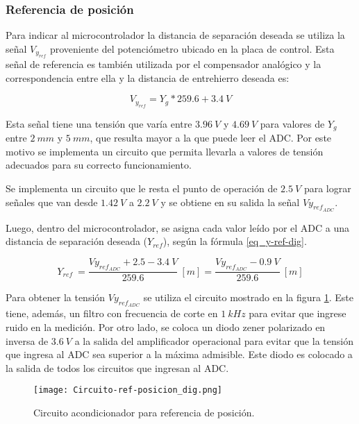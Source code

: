 \subsubsection{Referencia de posición} \label{sec_referencia_pos}

 Para indicar al microcontrolador la distancia de separación deseada se utiliza la señal  $V_{y_{ref}}$ proveniente del potenciómetro ubicado en la placa de control. Esta señal de referencia es también utilizada por el compensador analógico y la correspondencia entre ella y la distancia de entrehierro deseada es:
 
 \begin{equation} \label{eq_vyref_vs_yg}
 	V_{y_{ref}}=Y_g*259.6+3.4\:V
 \end{equation}
 
Esta señal tiene una tensión que varía entre $3.96\:V$ y $4.69\:V$ para valores de $Y_g$ entre $2\:mm$ y $5\:mm$, que resulta mayor a la que puede leer el ADC. Por este motivo se implementa un circuito que permita llevarla a valores de tensión adecuados para su correcto funcionamiento. 

Se implementa un circuito que le resta el punto de operación de $2.5\:V$  para lograr señales que van desde $1.42\:V$ a $2.2\:V$ y se obtiene en su salida la señal $Vy_{ref_{ADC}}$.

Luego, dentro del microcontrolador, se asigna cada valor leído por el ADC a una distancia de separación deseada ($Y_{ref}$), según la fórmula \ref{eq_y-ref-dig}.

\begin{equation} \label{eq_y-ref-dig}
	Y_{ref}\ =\frac{Vy_{ref_{ADC}} +2.5 - 3.4\:V}{259.6}\:[m]=\frac{Vy_{ref_{ADC}} - 0.9\:V}{259.6}\:[m]
\end{equation}

Para obtener la tensión $Vy_{ref_{ADC}}$ se utiliza el circuito mostrado en la figura \ref{fig:circuito-ref-posicion}. Este tiene, además, un filtro con frecuencia de corte en $1\:kHz$ para evitar que ingrese ruido en la medición. Por otro lado, se coloca un diodo zener polarizado en inversa de $3.6\:V$ a la salida del amplificador operacional para evitar que la tensión que ingresa al ADC sea superior a la máxima admisible. Este diodo es colocado a la salida de todos los circuitos que ingresan al ADC.


\begin{figure}[H]
	\centering
	\texttt{[image: Circuito-ref-posicion\_dig.png]}
	\caption{Circuito acondicionador para referencia de posición.}
	\label{fig:circuito-ref-posicion}
\end{figure}


